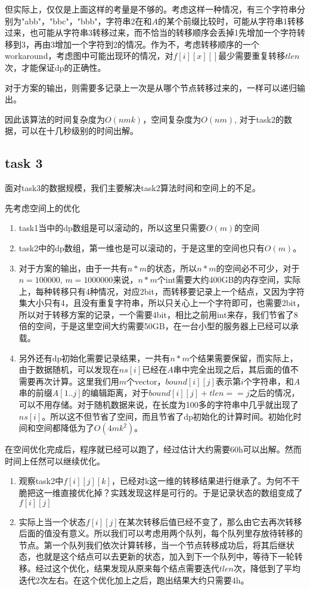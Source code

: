 \documentclass[a4paper, 11pt, nofonts, nocap, fancyhdr]{ctexart}
\begin{document}
但实际上，仅仅是上面这样的考量是不够的。考虑这样一种情况，有三个字符串分别为"abb"，"bbc"，"bbb"，字符串2在和$A$的某个前缀比较时，可能从字符串1转移过来，也可能从字符串3转移过来，而不恰当的转移顺序会丢掉1先增加一个字符转移到3，再由3增加一个字符到2的情况。作为不，考虑转移顺序的一个workaround，考虑图中可能出现环的情况，对$f[i][x][]$最少需要重复转移$tlen$次，才能保证dp的正确性。

对于方案的输出，则需要多记录上一次是从哪个节点转移过来的，一样可以递归输出。

因此该算法的时间复杂度为$O(nmk)$，空间复杂度为$O(nm)$, 对于task2的数据，可以在十几秒级别的时间出解。

\subsection{task 3}

面对task3的数据规模，我们主要解决task2算法时间和空间上的不足。

先考虑空间上的优化
\begin{enumerate}
\item task1当中的dp数组是可以滚动的，所以这里只需要$O(m)$的空间
\item task2中的dp数组，第一维也是可以滚动的，于是这里的空间也只有$O(m)$。
\item 对于方案的输出，由于一共有$n*m$的状态，所以$n*m$的空间必不可少，对于$n=100000$, $m=1000000$来说，$n*m$个int需要大约400GB的内存空间，实际上，每种转移只有4种情况，对应2bit，而转移要记录上一个结点，又因为字符集大小只有4，且没有重复字符串，所以只关心上一个字符即可，也需要2bit，所以对于转移方案的记录，一个需要4bit，相比之前用int来存，我们节省了8倍的空间，于是这里空间大约需要50GB，在一台小型的服务器上已经可以承载。
\item 另外还有dp初始化需要记录结果，一共有$n*m$个结果需要保留，而实际上，由于数据随机，可以发现在$ns[i]$已经在$A$串中完全出现之后，其后面的值不需要再次计算。这里我们用$m$个vector，$bound[i][j]$表示第$i$个字符串，和$A$串的前缀$A[1..j]$的编辑距离，对于$bound[i][j]+tlen==j$之后的情况，可以不用存储。对于随机数据来说，在长度为100多的字符串中几乎就出现了$ns[i]$。所以这不但节省了空间，而且节省了dp初始化的计算时间。初始化时间和空间都降低为了$O(4mk^{2})$。
\end{enumerate}

在空间优化完成后，程序就已经可以跑了，经过估计大约需要60h可以出解。然而时间上任然可以继续优化。
\begin{enumerate}
\item 观察task2中$f[i][j][k]$，已经对k这一维的转移结果进行继承了。为何不干脆把这一维直接优化掉？实践发现这样是可行的。于是记录状态的数组变成了$f[i][j]$
\item 实际上当一个状态$f[i][j]$在某次转移后值已经不变了，那么由它去再次转移后面的值没有意义。所以我们可以考虑用两个队列，每个队列里存放待转移的节点。第一个队列我们依次计算转移，当一个节点转移成功后，将其后继状态，也就是这个结点可以去更新的状态，加入到下一个队列中，等待下一轮转移。经过这个优化，结果发现从原来每个结点需要迭代$tlen$次，降低到了平均迭代2次左右。在这个优化加上之后，跑出结果大约只需要4h。
\end{enumerate}
\end{document}

